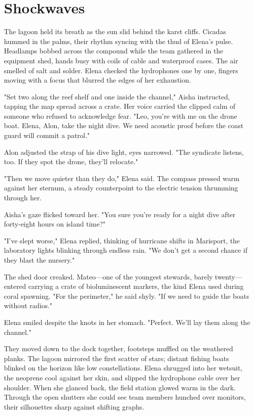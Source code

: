 \chapter{Shockwaves}

The lagoon held its breath as the sun slid behind the karst cliffs. Cicadas hummed in the palms, their rhythm syncing with the thud of Elena's pulse. Headlamps bobbed across the compound while the team gathered in the equipment shed, hands busy with coils of cable and waterproof cases. The air smelled of salt and solder. Elena checked the hydrophones one by one, fingers moving with a focus that blurred the edges of her exhaustion.

"Set two along the reef shelf and one inside the channel," Aisha instructed, tapping the map spread across a crate. Her voice carried the clipped calm of someone who refused to acknowledge fear. "Leo, you're with me on the drone boat. Elena, Alon, take the night dive. We need acoustic proof before the coast guard will commit a patrol."

Alon adjusted the strap of his dive light, eyes narrowed. "The syndicate listens, too. If they spot the drone, they'll relocate."

"Then we move quieter than they do," Elena said. The compass pressed warm against her sternum, a steady counterpoint to the electric tension thrumming through her.

Aisha's gaze flicked toward her. "You sure you're ready for a night dive after forty-eight hours on island time?"

"I've slept worse," Elena replied, thinking of hurricane shifts in Marisport, the laboratory lights blinking through endless rain. "We don't get a second chance if they blast the nursery."

The shed door creaked. Mateo—one of the youngest stewards, barely twenty—entered carrying a crate of bioluminescent markers, the kind Elena used during coral spawning. "For the perimeter," he said shyly. "If we need to guide the boats without radios."

Elena smiled despite the knots in her stomach. "Perfect. We'll lay them along the channel."

They moved down to the dock together, footsteps muffled on the weathered planks. The lagoon mirrored the first scatter of stars; distant fishing boats blinked on the horizon like low constellations. Elena shrugged into her wetsuit, the neoprene cool against her skin, and slipped the hydrophone cable over her shoulder. When she glanced back, the field station glowed warm in the dark. Through the open shutters she could see team members hunched over monitors, their silhouettes sharp against shifting graphs.

